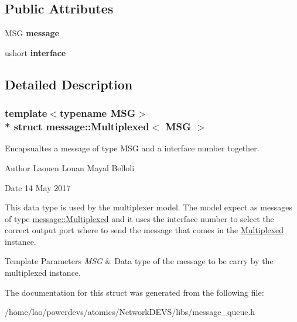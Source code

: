 \subsection*{Public Attributes}
\begin{DoxyCompactItemize}
\item 
M\+SG {\bfseries message}\hypertarget{structmessage_1_1Multiplexed_afa6592047ba3b8ca1d82000e862dd8a8}{}\label{structmessage_1_1Multiplexed_afa6592047ba3b8ca1d82000e862dd8a8}

\item 
ushort {\bfseries interface}\hypertarget{structmessage_1_1Multiplexed_a3c1897b89f1649045e2ab89ad9007c7f}{}\label{structmessage_1_1Multiplexed_a3c1897b89f1649045e2ab89ad9007c7f}

\end{DoxyCompactItemize}


\subsection{Detailed Description}
\subsubsection*{template$<$typename M\+SG$>$\\*
struct message\+::\+Multiplexed$<$ M\+S\+G $>$}

Encapsualtes a message of type M\+SG and a interface number together. 

\begin{DoxyAuthor}{Author}
Laouen Louan Mayal Belloli 
\end{DoxyAuthor}
\begin{DoxyDate}{Date}
14 May 2017
\end{DoxyDate}
This data type is used by the multiplexer model. The model expect as messages of type \hyperlink{structmessage_1_1Multiplexed}{message\+::\+Multiplexed} and it uses the interface number to select the correct output port where to send the message that comes in the \hyperlink{structmessage_1_1Multiplexed}{Multiplexed} instance.


\begin{DoxyTemplParams}{Template Parameters}
{\em M\+SG} & Data type of the message to be carry by the multiplexed instance. \\
\hline
\end{DoxyTemplParams}


The documentation for this struct was generated from the following file\+:\begin{DoxyCompactItemize}
\item 
/home/lao/powerdevs/atomics/\+Network\+D\+E\+V\+S/libs/message\+\_\+queue.\+h\end{DoxyCompactItemize}
